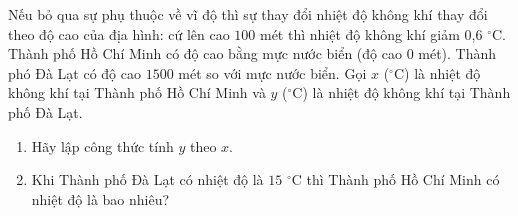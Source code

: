 \begin{bt}%
	Nếu bỏ qua sự phụ thuộc về vĩ độ thì sự thay đổi nhiệt độ không khí thay đổi theo độ cao của địa hình: cứ lên cao $100$ mét thì nhiệt độ không khí giảm $0\text{,}6$ $^\circ$C. Thành phố Hồ Chí Minh có độ cao bằng mực nước biển (độ cao $0$ mét). Thành phó Đà Lạt có độ cao $1500$ mét so với mực nước biển. Gọi $x$ ($^\circ$C) là nhiệt độ không khí tại Thành phố Hồ Chí Minh và $y$ ($^\circ$C) là nhiệt độ không khí tại Thành phố Đà Lạt.
	\begin{enumerate}
		\item Hãy lập công thức tính $y$ theo $x$.
		\item Khi Thành phố Đà Lạt có nhiệt độ là $15$  $^\circ$C thì Thành phố Hồ Chí Minh có nhiệt độ là bao nhiêu?
	\end{enumerate}
\end{bt}
